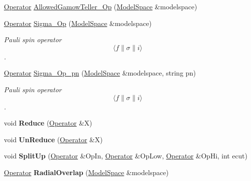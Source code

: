 \begin{DoxyCompactItemize}
\item 
\hyperlink{classOperator}{Operator} \hyperlink{namespaceimsrg__util_a06db1031b1af9f760afd2014632dd36d}{Allowed\+Gamow\+Teller\+\_\+\+Op} (\hyperlink{classModelSpace}{Model\+Space} \&modelspace)
\item 
\mbox{\label{namespaceimsrg__util_a1809ec33e42bf0946acb265fd67aad28}} 
\hyperlink{classOperator}{Operator} \hyperlink{namespaceimsrg__util_a1809ec33e42bf0946acb265fd67aad28}{Sigma\+\_\+\+Op} (\hyperlink{classModelSpace}{Model\+Space} \&modelspace)
\begin{DoxyCompactList}\small\item\em Pauli spin operator \[ \langle f \| \sigma \| i \rangle \]. \end{DoxyCompactList}\item 
\mbox{\label{namespaceimsrg__util_a0b8543c18949ab3fc9dd22eebd0eab4e}} 
\hyperlink{classOperator}{Operator} \hyperlink{namespaceimsrg__util_a0b8543c18949ab3fc9dd22eebd0eab4e}{Sigma\+\_\+\+Op\+\_\+pn} (\hyperlink{classModelSpace}{Model\+Space} \&modelspace, string pn)
\begin{DoxyCompactList}\small\item\em Pauli spin operator \[ \langle f \| \sigma \| i \rangle \]. \end{DoxyCompactList}\item 
\mbox{\label{namespaceimsrg__util_ae7af6b5f33adf3dabb5ab6628a1a8f32}} 
void {\bfseries Reduce} (\hyperlink{classOperator}{Operator} \&X)
\item 
\mbox{\label{namespaceimsrg__util_a3797cf0a0abd834c1c446f3948b64b58}} 
void {\bfseries Un\+Reduce} (\hyperlink{classOperator}{Operator} \&X)
\item 
\mbox{\label{namespaceimsrg__util_a765d6419342a01edb33d45f95286b2d6}} 
void {\bfseries Split\+Up} (\hyperlink{classOperator}{Operator} \&Op\+In, \hyperlink{classOperator}{Operator} \&Op\+Low, \hyperlink{classOperator}{Operator} \&Op\+Hi, int ecut)
\item 
\mbox{\label{namespaceimsrg__util_afd20ff9a544f755f3e26ea1328fca132}} 
\hyperlink{classOperator}{Operator} {\bfseries Radial\+Overlap} (\hyperlink{classModelSpace}{Model\+Space} \&modelspace)

\end{DoxyCompactItemize}
